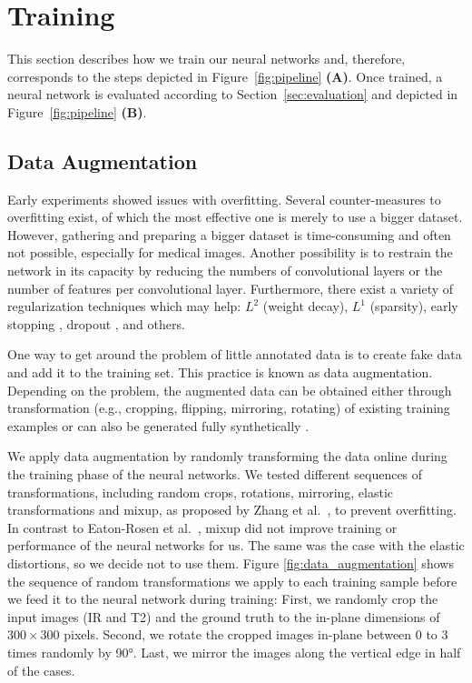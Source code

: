 \section{Training} \label{sec:training}
This section describes how we train our neural networks and, therefore, corresponds to the steps depicted in Figure~\ref{fig:pipeline} \textbf{(A)}. Once trained, a neural network is evaluated according to Section~\ref{sec:evaluation} and depicted in Figure~\ref{fig:pipeline} \textbf{(B)}.

\subsection{Data Augmentation} \label{sec:trainig:data_augmentation}
Early experiments showed issues with overfitting. Several counter-measures to overfitting exist, of which the most effective one is merely to use a bigger dataset. However, gathering and preparing a bigger dataset is time-consuming and often not possible, especially for medical images. Another possibility is to restrain the network in its capacity by reducing the numbers of convolutional layers or the number of features per convolutional layer.
Furthermore, there exist a variety of regularization techniques which may help:
$L^2$ (weight decay), $L^1$ (sparsity), early stopping \cite{Goodfellow2016DeepLearning}, dropout \cite{Srivastava2014Dropout:Overfitting}, and others.

One way to get around the problem of little annotated data is to create fake data and add it to the training set. This practice is known as data augmentation. Depending on the problem, the augmented data can be obtained either through transformation (e.g., cropping, flipping, mirroring, rotating) of existing training examples or can also be generated fully synthetically \cite{Tetteh2018DeepVesselNet:Volumes}.

We apply data augmentation by randomly transforming the data online during the training phase of the neural networks. We tested different sequences of transformations, including random crops, rotations, mirroring, elastic transformations and mixup, as proposed by Zhang et al.~\cite{Zhang2017Mixup:Minimization}, to prevent overfitting. In contrast to Eaton-Rosen et al.~\cite{Eaton-rosen2018ImprovingSegmentation}, mixup did not improve training or performance of the neural networks for us. The same was the case with the elastic distortions, so we decide not to use them. Figure \ref{fig:data_augmentation} shows the sequence of random transformations we apply to each training sample before we feed it to the neural network during training: First, we randomly crop the input images (IR and T2) and the ground truth to the in-plane dimensions of $300 \times 300$ pixels. Second, we rotate the cropped images in-plane between 0 to 3 times randomly by 90\si{\degree}. Last, we mirror the images along the vertical edge in half of the cases.

